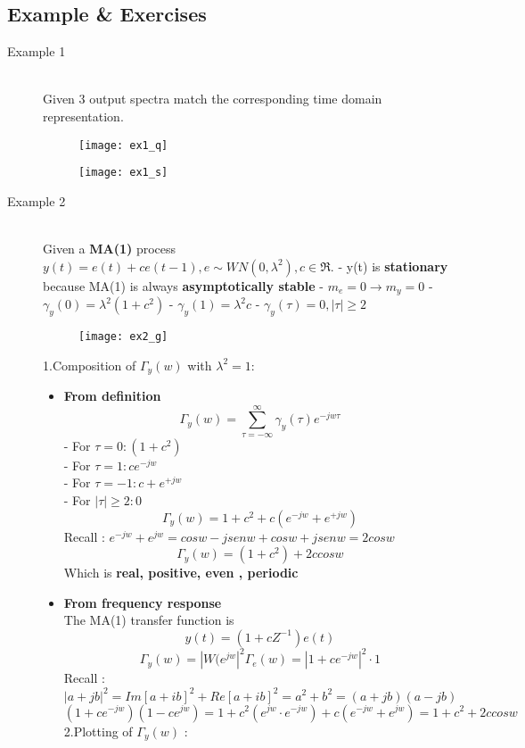 \subsection{Example \& Exercises }
\begin{description}
\item[Example 1]\hfill\\
Given 3 output spectra match the corresponding time domain representation.
\begin{figure}[H]
 \centering
  \texttt{[image: ex1\_q]}
\end{figure}
\begin{figure}[H]
 \centering
  \texttt{[image: ex1\_s]}
\end{figure}

\newpage
\item [Example 2]\hfill\\
Given a \textbf{MA(1)} process $ y(t)= e(t) + ce(t-1)  , e \sim WN(0,\lambda^2) , c \in \Re$.
- y(t) is \textbf{stationary} because MA(1) is always \textbf{asymptotically stable}
- $m_e = 0 \to m_y = 0 $
- $\gamma_y(0) = \lambda^2(1+c^2) $
- $\gamma_y(1) = \lambda^2c $
- $ \gamma_y(\tau) = 0 , |\tau| \geq 2 $
\begin{figure}[H]
 \centering
  \texttt{[image: ex2\_g]}
\end{figure}
1.Composition of $\Gamma_y(w)$ with $\lambda^2 = 1$:
\begin{itemize}
\item \textbf{From definition}\\
$$ \Gamma_y(w) = \sum\limits_{\tau = -\infty}^{\infty} \gamma_y(\tau)e^{-jw\tau} $$ 
- For $\tau =0 :(1+c^2) $\\
- For $\tau =1 : ce^{-jw} $\\
- For $\tau =-1 : c+e^{+jw}$\\
- For $|\tau| \geq 2 : 0 $
$$ \Gamma_y(w) = 1+c^2 + c(e^{-jw}+e^{+jw})$$
Recall : $ e^{-jw} + e^{jw} = cosw - jsenw + cosw + jsenw = 2cosw $
$$ \Gamma_y(w) = (1+c^2) + 2c cosw $$
Which is \textbf{real, positive, even , periodic}
\item \textbf{From frequency response}\\
The MA(1) transfer function is $$ y(t) = (1+cZ^{-1})e(t) $$
$$ \Gamma_y(w) = |W(e^{jw}|^2\Gamma_e(w) = |1+ce^{-jw}|^2 \cdot 1 $$
Recall : $ |a+jb|^2 = Im[a+ib]^2+Re[a+ib]^2 = a^2+b^2 = (a+jb)(a-jb) $
$$ (1+ce^{-jw})(1-ce^{jw}) = 1+c^2(e^{jw} \cdot e^{-jw})+c(e^{-jw}+e^{jw}) = 1+c^2+2c cosw $$
2.Plotting of $ \Gamma_y(w)$ : \\

\end{itemize}
\end{description}
